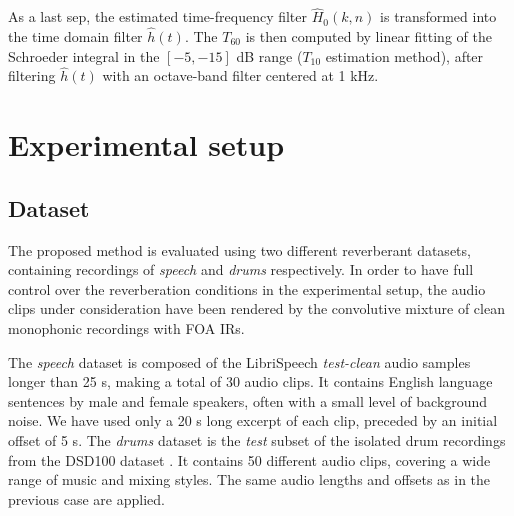 As a last sep, the estimated time-frequency filter $\hat{H}_0(k,n)$ is transformed into the time domain filter $\hat{h}(t)$. The $T_{60}$ is then computed by linear fitting of the Schroeder integral 
in the $[-5, -15] $ dB range ($T_{10}$ estimation method), after filtering $\hat{h}(t)$ with an octave-band filter centered at 1 kHz. 




\section{Experimental setup}
\label{sec:experimental}

\vspace{-2mm}
\subsection{Dataset}

The proposed method is evaluated using two different reverberant datasets, containing recordings of \textit{speech} and \textit{drums} respectively. 
In order to have full control over the reverberation conditions in the experimental setup, the audio clips under consideration have been rendered by the convolutive mixture of clean monophonic recordings with FOA IRs.

The \textit{speech} dataset is composed of the LibriSpeech \cite{panayotov2015librispeech} \textit{test-clean} audio samples longer than 25 s, making a total of 30 audio clips. It contains English language sentences by male and female speakers, often with a small level of background noise. We have used only a 20 s long excerpt of each clip, preceded by an initial offset of 5 s. 
The \textit{drums} dataset is the \textit{test} subset of the isolated drum recordings from the DSD100 dataset \cite{SiSEC16}. It contains 50 different audio clips, covering a wide range of music and mixing styles. The same audio lengths and offsets as in the previous case are applied.

